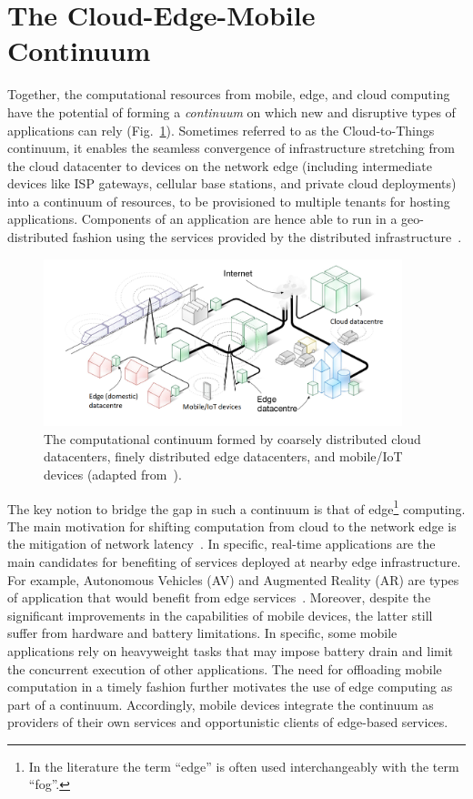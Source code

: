 \section{The Cloud-Edge-Mobile Continuum}\label{sec:continuum}

Together, the computational resources from mobile, edge, and cloud computing have the potential of forming a \textit{continuum} on which new and disruptive types of applications can rely (Fig.~\ref{fig:continuum-overral}). Sometimes referred to as the Cloud-to-Things continuum, it enables the seamless convergence of infrastructure stretching from the cloud datacenter to devices on the network edge (including intermediate devices like ISP gateways, cellular base stations, and private cloud deployments) into a continuum of resources, to be provisioned to multiple tenants for hosting applications. Components of an application are hence able to run in a geo-distributed fashion using the services provided by the distributed infrastructure~\cite{GuptaIfogSim17}. 

\begin{figure}[tbp]
	\includegraphics[width=0.93\textwidth]{figs/Continuum-overall.png}
	\caption{The computational continuum formed by coarsely distributed cloud datacenters, finely distributed edge datacenters, and mobile/IoT devices (adapted from~\cite{Tarneberg2017}).}
	\label{fig:continuum-overral}
\end{figure}

The key notion to bridge the gap in such a continuum is that of edge\footnote{In the literature the term ``edge'' is often used interchangeably with the term ``fog''.} computing. The main motivation for shifting computation from cloud to the network edge is the mitigation of network latency~\cite{Bonomi2014}. In specific, real-time applications are the main candidates for benefiting of services deployed at nearby edge infrastructure. For example, Autonomous Vehicles (AV) and Augmented Reality (AR) are types of application that would benefit from edge services~\cite{Bonomi:2012,GarrigaMendonca2017}. Moreover, despite the significant improvements in the capabilities of mobile devices, the latter still suffer from hardware and battery limitations. In specific, some mobile applications rely on heavyweight tasks that may impose battery drain and limit the concurrent execution of other applications. The need for offloading mobile computation in a timely fashion further motivates the use of edge computing as part of a continuum. Accordingly, mobile devices integrate the continuum as providers of their own services and opportunistic clients of edge-based services.

